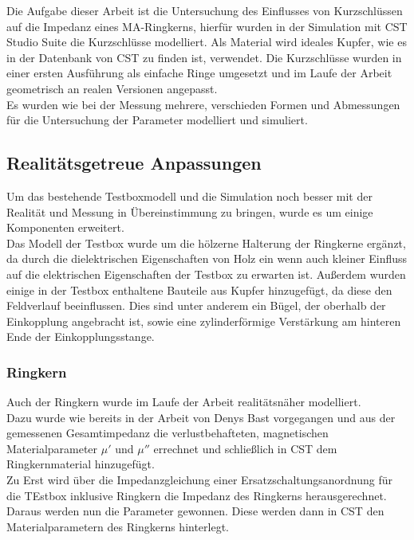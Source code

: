        
        Die Aufgabe dieser Arbeit ist die Untersuchung des Einflusses von Kurzschlüssen auf die Impedanz eines MA-Ringkerns, hierfür wurden in der Simulation mit CST Studio Suite die Kurzschlüsse modelliert. Als Material wird ideales Kupfer, wie es in der Datenbank von CST zu finden ist, verwendet. Die Kurzschlüsse wurden in einer ersten Ausführung als einfache Ringe umgesetzt und im Laufe der Arbeit geometrisch an realen Versionen angepasst.\\
        Es wurden wie bei der Messung mehrere, verschieden Formen und Abmessungen für die Untersuchung der Parameter modelliert und simuliert.
        
        \subsection{Realitätsgetreue Anpassungen}
        Um das bestehende Testboxmodell und die Simulation noch besser mit der Realität und Messung in Übereinstimmung zu bringen, wurde es um einige Komponenten erweitert.\\
        Das Modell der Testbox wurde um die hölzerne Halterung der Ringkerne ergänzt, da durch die dielektrischen Eigenschaften von Holz ein wenn auch kleiner Einfluss auf die elektrischen Eigenschaften der Testbox zu erwarten ist. Außerdem wurden einige in der Testbox enthaltene Bauteile aus Kupfer hinzugefügt, da diese den Feldverlauf beeinflussen. Dies sind unter anderem ein Bügel, der oberhalb der Einkopplung angebracht ist, sowie eine zylinderförmige Verstärkung am hinteren Ende der Einkopplungsstange.
        
            \subsubsection{Ringkern}
            Auch der Ringkern wurde im Laufe der Arbeit realitätsnäher modelliert.\\
            Dazu wurde wie bereits in der Arbeit von Denys Bast vorgegangen und aus der gemessenen Gesamtimpedanz die verlustbehafteten, magnetischen Materialparameter $\mu'$ und $\mu''$ errechnet und schließlich in CST dem Ringkernmaterial hinzugefügt.\\
            Zu Erst wird über die Impedanzgleichung einer Ersatzschaltungsanordnung für die TEstbox inklusive Ringkern die Impedanz des Ringkerns herausgerechnet. Daraus werden nun die Parameter gewonnen. Diese werden dann in CST den Materialparametern des Ringkerns hinterlegt.
